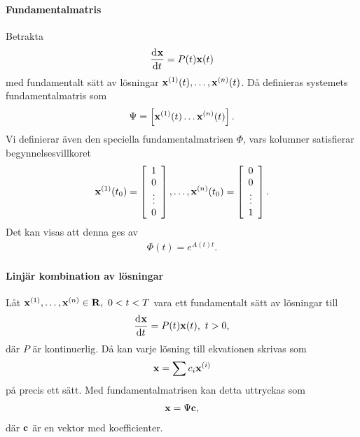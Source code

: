\paragraph{Fundamentalmatris}
Betrakta
\begin{align*}
	\dv[]{\vb{x}}{t} (t) = P(t)\vb{x}(t)
\end{align*}
med fundamentalt sätt av lösningar $\vb{x}^{(1)}(t), \dots, \vb{x}^{(n)}(t)$. Då definieras systemets fundamentalmatris som
\begin{align*}
	\Psi = \left[\vb{x}^{(1)}(t) \dots \vb{x}^{(n)}(t)\right].
\end{align*}
Vi definierar även den speciella fundamentalmatrisen $\Phi$, vars kolumner satisfierar begynnelsesvillkoret
\begin{align*}
	\vb{x}^{(1)}(t_{0}) =
	\left[\begin{array}{c}
		1      \\
		0      \\
		\vdots \\
		0
	\end{array}\right],
	\dots,
	\vb{x}^{(n)}(t_{0}) =
	\left[\begin{array}{c}
		0      \\
		0      \\
		\vdots \\
		1
	\end{array}\right].
\end{align*}
Det kan visas att denna ges av
\begin{align*}
	\Phi(t) = e^{A(t)t}.
\end{align*}

\paragraph{Linjär kombination av lösningar}
Låt $\vb{x}^{(1)}, \dots, \vb{x}^{(n)}\in\mathbf{R},\ 0 < t < T$ vara ett fundamentalt sätt av lösningar till
\begin{align*}
	\dv[]{\vb{x}}{t} (t) = P(t)\vb{x}(t),\ t > 0,
\end{align*}
där $P$ är kontinuerlig. Då kan varje lösning till ekvationen skrivas som
\begin{align*}
	\vb{x} = \sum c_{i}\vb{x}^{(i)}
\end{align*}
på precis ett sätt. Med fundamentalmatrisen kan detta uttryckas som
\begin{align*}
	\vb{x} = \Psi\vb{c},
\end{align*}
där $\vb{c}$ är en vektor med koefficienter.

